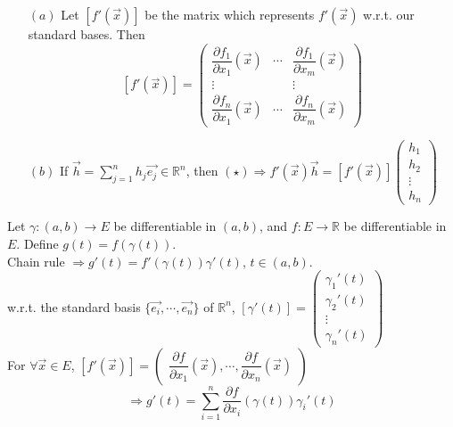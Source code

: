 \begin{remark}
    \begin{enumerate}
        \item[$ (a) $] Let  $ [f'(\vec{x})] $ be the matrix which represents  $ f'(\vec{x }) $ w.r.t. our standard bases. Then 
            \[
                [f'(\vec{x})]=\begin{pmatrix}
                    \dfrac{\partial f_1}{\partial x_1} (\vec{x}) & \cdots &
                    \dfrac{\partial f_1}{\partial x_m} (\vec{x}) \\
                    \vdots & & \vdots \\
                    \dfrac{\partial f_n}{\partial x_1} (\vec{x}) & \cdots &
                    \dfrac{\partial f_n}{\partial x_m} (\vec{x})
                \end{pmatrix}
            \]
        \item[$ (b) $] If  $ \vec{h }=\sum\limits_{j=1 }^{n } h_j \vec{e_j }\in \mathbb{R }^n  $, then  $ (\star )\Rightarrow f'(\vec{x })\vec{h }=[f'(\vec{x})]\begin{pmatrix}
            h_1\\h_2\\\vdots\\h_n
        \end{pmatrix}  $  
    \end{enumerate}
\end{remark}
Let  $ \gamma:(a,b)\rightarrow E   $ be differentiable in  $ (a,b) $, and  $ f:E\rightarrow \mathbb{R }   $ be differentiable in  $ E  $. Define  $ g(t)=f(\gamma(t)) $.\\
 Chain rule  $ \Rightarrow  g'(t)=f'(\gamma(t))\gamma'(t),\,t\in (a,b)$.\\
  w.r.t. the  standard basis  $ \{\vec{e_i },\cdots,\vec{e_n }\} $ of  $ \mathbb{R}^n  $,  $ [\gamma'(t)]=\begin{pmatrix}
    \gamma_1'(t)\\\gamma_2'(t)\\\vdots\\\gamma_n'(t)
\end{pmatrix} $\\
For  $ \forall \vec{x }\in E  $,  $ [f'(\vec{x})]=\begin{pmatrix}
    \dfrac{\partial f}{\partial x_1}(\vec{x}),\cdots,\dfrac{\partial f}{\partial x_n}(\vec{x})
\end{pmatrix} $    
\begin{equation}\tag{$ \triangle  $}
    \Rightarrow g'(t)=\sum\limits_{i=1 }^{n } \frac{\partial f}{\partial x_i}(\gamma(t))\gamma_i'(t)
\end{equation}
